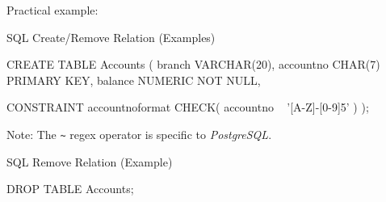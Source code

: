 \begin{multicols}{2}
\begin{CheatsheetEntryFrame}
        Practical example:
        \begin{center}


        \end{center}

        \SqlSubsectionAddSeparation
        \begin{SqlSubsection}{SQL Create/Remove Relation (Examples)}
            \begin{CheatsheetSubsectionLst}
                CREATE TABLE Accounts (
                    branch      VARCHAR(20),
                    accountno   CHAR(7)       PRIMARY KEY,
                    balance     NUMERIC       NOT NULL,

                    CONSTRAINT accountnoformat CHECK(
                        accountno ~ '[A-Z]-[0-9]{5}'
                    )
                );
            \end{CheatsheetSubsectionLst}

            \medskip
            {\footnotesize Note: The \texttt{\textasciitilde} regex operator is specific to \textit{PostgreSQL}.}
        \end{SqlSubsection}
        \SqlSubsectionReduceSkip
        \begin{SqlSubsection}{SQL Remove Relation (Example)}%
            \begin{CheatsheetSubsectionLst}
                DROP TABLE Accounts;
            \end{CheatsheetSubsectionLst}
        \end{SqlSubsection}


\end{CheatsheetEntryFrame}
\end{multicols}
